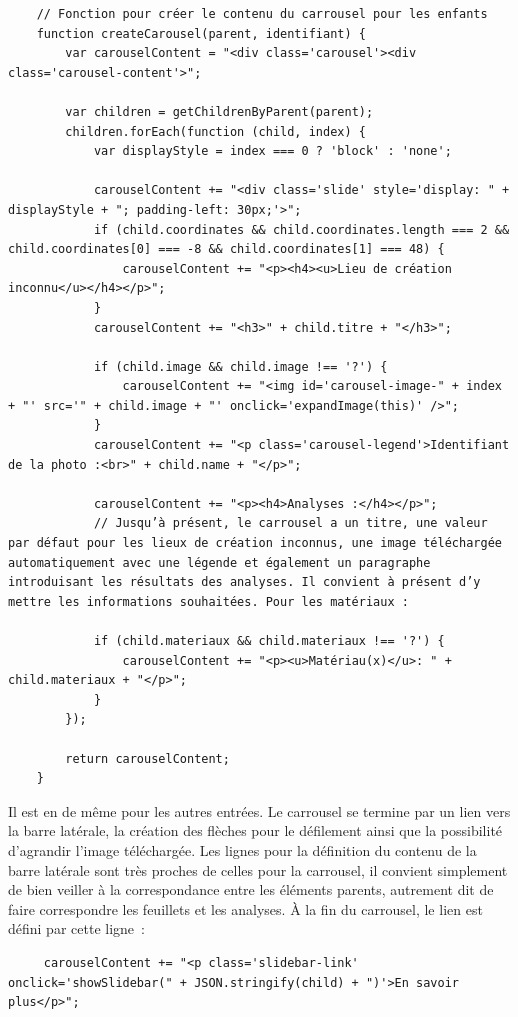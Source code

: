 \begin{lstlisting}
	// Fonction pour créer le contenu du carrousel pour les enfants
	function createCarousel(parent, identifiant) {
		var carouselContent = "<div class='carousel'><div class='carousel-content'>";
		
		var children = getChildrenByParent(parent);
		children.forEach(function (child, index) {
			var displayStyle = index === 0 ? 'block' : 'none';
			
			carouselContent += "<div class='slide' style='display: " + displayStyle + "; padding-left: 30px;'>";
			if (child.coordinates && child.coordinates.length === 2 && child.coordinates[0] === -8 && child.coordinates[1] === 48) {
				carouselContent += "<p><h4><u>Lieu de création inconnu</u></h4></p>";
			}
			carouselContent += "<h3>" + child.titre + "</h3>";
			
			if (child.image && child.image !== '?') {
				carouselContent += "<img id='carousel-image-" + index + "' src='" + child.image + "' onclick='expandImage(this)' />";
			}
			carouselContent += "<p class='carousel-legend'>Identifiant de la photo :<br>" + child.name + "</p>";
			
			carouselContent += "<p><h4>Analyses :</h4></p>";
			// Jusqu’à présent, le carrousel a un titre, une valeur par défaut pour les lieux de création inconnus, une image téléchargée automatiquement avec une légende et également un paragraphe introduisant les résultats des analyses. Il convient à présent d’y mettre les informations souhaitées. Pour les matériaux : 
			
			if (child.materiaux && child.materiaux !== '?') {
				carouselContent += "<p><u>Matériau(x)</u>: " + child.materiaux + "</p>";
			}
		});
		
		return carouselContent;
	}
\end{lstlisting}\par
Il est en de même pour les autres entrées. Le carrousel se termine par un lien vers la barre latérale, la création des flèches pour le défilement ainsi que la possibilité d’agrandir l’image téléchargée. Les lignes pour la définition du contenu de la barre latérale sont très proches de celles pour la carrousel, il convient simplement de bien veiller à la correspondance entre les éléments parents, autrement dit de faire correspondre les feuillets et les analyses. À la fin du carrousel, le lien est défini par cette ligne~:
\begin{lstlisting}
	 carouselContent += "<p class='slidebar-link' onclick='showSlidebar(" + JSON.stringify(child) + ")'>En savoir plus</p>";
\end{lstlisting}\par
